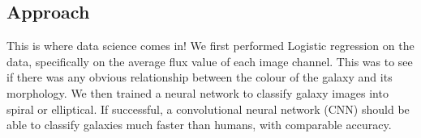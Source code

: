 \subsection{Approach}
This is where data science comes in!
We first performed Logistic regression on the data, specifically on the average flux value of each image channel. 
This was to see if there was any obvious relationship between the colour of the galaxy and its morphology. 
We then trained a neural network to classify galaxy images into spiral or elliptical.
If successful, a convolutional neural network (CNN) should be able to classify galaxies much faster than humans, with comparable accuracy.












